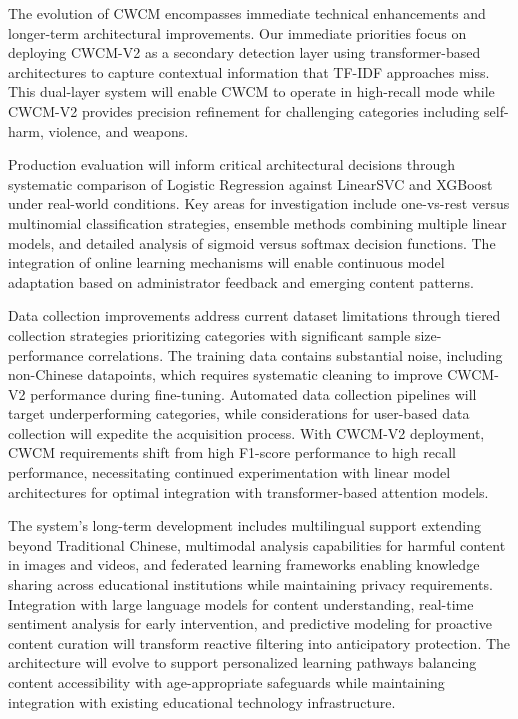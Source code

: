 \documentclass[
  titlepage]{article}
\begin{document}
The evolution of CWCM encompasses immediate technical enhancements and
longer-term architectural improvements. Our immediate priorities focus
on deploying CWCM-V2 as a secondary detection layer using
transformer-based architectures to capture contextual information that
TF-IDF approaches miss. This dual-layer system will enable CWCM to
operate in high-recall mode while CWCM-V2 provides precision refinement
for challenging categories including self-harm, violence, and weapons.

Production evaluation will inform critical architectural decisions
through systematic comparison of Logistic Regression against LinearSVC
and XGBoost under real-world conditions. Key areas for investigation
include one-vs-rest versus multinomial classification strategies,
ensemble methods combining multiple linear models, and detailed analysis
of sigmoid versus softmax decision functions. The integration of online
learning mechanisms will enable continuous model adaptation based on
administrator feedback and emerging content patterns.

Data collection improvements address current dataset limitations through
tiered collection strategies prioritizing categories with significant
sample size-performance correlations. The training data contains
substantial noise, including non-Chinese datapoints, which requires
systematic cleaning to improve CWCM-V2 performance during fine-tuning.
Automated data collection pipelines will target underperforming
categories, while considerations for user-based data collection will
expedite the acquisition process. With CWCM-V2 deployment, CWCM
requirements shift from high F1-score performance to high recall
performance, necessitating continued experimentation with linear model
architectures for optimal integration with transformer-based attention
models.

The system's long-term development includes multilingual support
extending beyond Traditional Chinese, multimodal analysis capabilities
for harmful content in images and videos, and federated learning
frameworks enabling knowledge sharing across educational institutions
while maintaining privacy requirements. Integration with large language
models for content understanding, real-time sentiment analysis for early
intervention, and predictive modeling for proactive content curation
will transform reactive filtering into anticipatory protection. The
architecture will evolve to support personalized learning pathways
balancing content accessibility with age-appropriate safeguards while
maintaining integration with existing educational technology
infrastructure.
\end{document}
